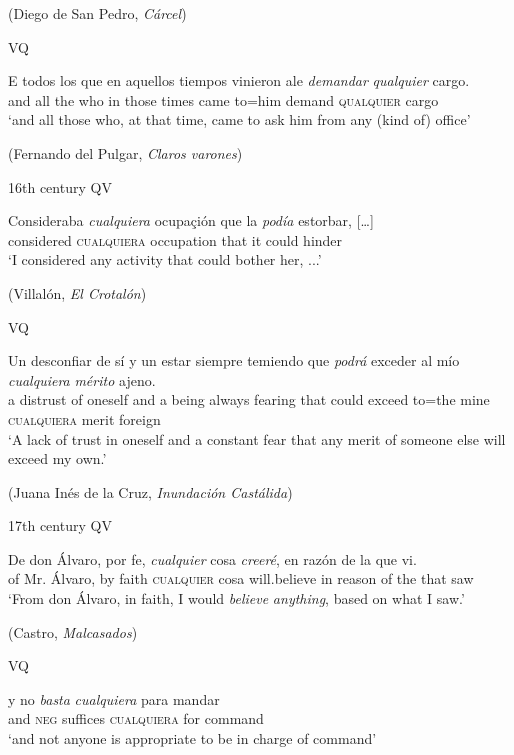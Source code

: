       (Diego de San Pedro, \textit{Cárcel})
      
\ex \label{ex:key:285-2} 
VQ

\gll  E todos los que en aquellos tiempos vinieron ale \textit{demandar} \textit{qualquier} {cargo}.\\
and all the who in those times came to=him demand \textsc{qualquier} {cargo}\\
\glt ‘and all those who, at that time, came to ask him from any (kind of) office’

      (Fernando del Pulgar, \textit{Claros varones})
\z
\z

\newpage
\ea \label{ex:key:286}
  16th century
\ea \label{ex:key:286-1} 
QV

\gll Consideraba \textit{cualquiera} ocupaçión que la \textit{podía} estorbar, […]\\
considered \textsc{cualquiera} occupation that it could hinder\\
\glt ‘I considered any activity that could bother her, ...’

(Villalón, \textit{El Crotalón})
      
\ex \label{ex:key:286-2} 
VQ 

\gll Un desconfiar de sí y un estar siempre temiendo que \textit{podrá} exceder al mío \textit{cualquiera} \textit{mérito} ajeno.\\
a distrust of oneself and a being always fearing that could exceed to=the mine \textsc{cualquiera} merit foreign\\
\glt ‘A lack of trust in oneself and a constant fear that any merit of someone else will exceed my own.’

(Juana Inés de la Cruz, \textit{Inundación Castálida})
\z
\z

\ea \label{ex:key:287}
  17th century
\ea \label{ex:key:287-1} 
QV 

\gll De don Álvaro, por fe, \textit{cualquier} cosa \textit{creeré}, en razón de la que vi.\\
of Mr. Álvaro, by faith \textsc{cualquier} cosa will.believe in reason of the that saw\\
\glt ‘From don Álvaro, in faith, I would \textit{believe} \textit{anything}, based on what I saw.’

(Castro, \textit{Malcasados})
      
\ex \label{ex:key:287-2} 
VQ 

\gll y no \textit{basta} \textit{cualquiera} para mandar\\
and \textsc{neg} suffices \textsc{cualquiera} for command\\
\glt ‘and not anyone is appropriate to be in charge of command’

